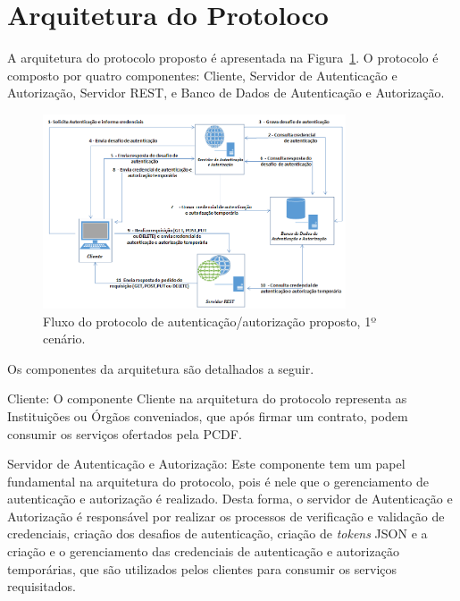 \section{Arquitetura do Protoloco}\label{sec:ArqProtocolo}

A arquitetura do protocolo proposto é apresentada na Figura~\ref{fig:arquiteturaprotocolo}. O protocolo é composto por quatro componentes: Cliente, Servidor de Autenticação e Autorização, Servidor REST, e Banco de Dados de Autenticação e Autorização.

\begin{figure}[!htb]
    \centering
    \includegraphics[width=0.8\textwidth]{arquitetura_protocolo.png}
    \caption{Fluxo do protocolo de autenticação/autorização proposto, 1º cenário.}
    \label{fig:arquiteturaprotocolo}
\end{figure}

Os componentes da arquitetura são detalhados a seguir.

Cliente: O componente Cliente na arquitetura do protocolo representa as Instituições ou Órgãos conveniados, que após firmar um contrato, podem consumir os serviços ofertados pela PCDF.

Servidor de Autenticação e Autorização: Este componente tem um papel fundamental na arquitetura do protocolo, pois é nele que o gerenciamento de autenticação e autorização é realizado. Desta forma, o servidor de Autenticação e Autorização é responsável por realizar os processos de verificação e validação de credenciais, criação dos desafios de autenticação, criação de \emph{tokens} JSON e a criação e o gerenciamento das credenciais de autenticação e autorização temporárias, que são utilizados pelos clientes para consumir os serviços requisitados.

